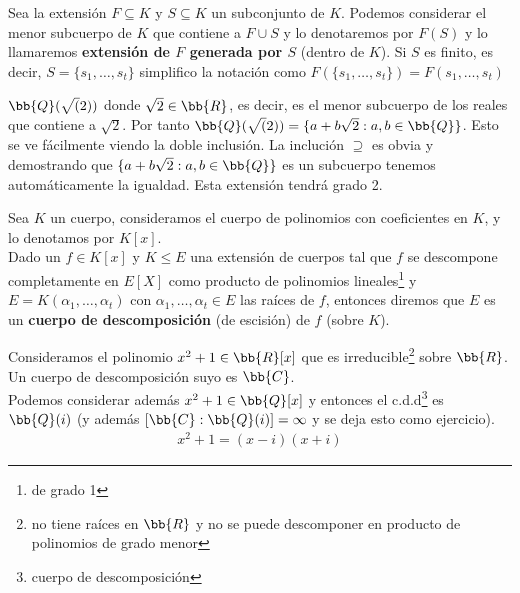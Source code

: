 \begin{notacion}
    Sea la extensión $F\subseteq K$ y $S\subseteq K$ un subconjunto de $K$. Podemos considerar el menor subcuerpo de $K$ que contiene a $F\cup S$ y lo denotaremos por $F(S)$ y lo llamaremos \textbf{extensión de $F$ generada por $S$} (dentro de $K$). Si $S$ es finito, es decir, $S=\{s_1,\dots,s_t\}$ simplifico la notación como $F(\{s_1,\dots,s_t\}) = F(s_1,\dots,s_t)$
\end{notacion}

\begin{ejemplo}
    $\bb{Q}(\sqrt(2))$ donde $\sqrt{2}\in \bb{R}$, es decir, es el menor subcuerpo de los reales que contiene a $\sqrt{2}$. Por tanto $\bb{Q}(\sqrt(2)) = \{a+b\sqrt{2} : a,b\in \bb{Q}\}$. Esto se ve fácilmente viendo la doble inclusión. La inclución $\supseteq$ es obvia y demostrando que $\{a+b\sqrt{2} : a,b\in \bb{Q}\}$ es un subcuerpo tenemos automáticamente la igualdad. Esta extensión tendrá grado 2.
\end{ejemplo}

\begin{definicion}
    Sea $K$ un cuerpo, consideramos el cuerpo de polinomios con coeficientes en $K$, y lo denotamos por $K[x]$. \\
    
    Dado un $f\in K[x]$ y $K\leq E$ una extensión de cuerpos tal que $f$ se descompone completamente en $E[X]$ como producto de polinomios lineales\footnote{de grado 1} y $E=K(\alpha_1,\dots,\alpha_t)$ con $\alpha_1, \dots, \alpha_t\in E$ las raíces de $f$, entonces diremos que $E$ es un \textbf{cuerpo de descomposición} (de escisión) de $f$ (sobre $K$).
\end{definicion}

\begin{ejemplo}
    Consideramos el polinomio $x^2 + 1 \in \bb{R}[x]$ que es irreducible\footnote{no tiene raíces en $\bb{R}$ y no se puede descomponer en producto de polinomios de grado menor} sobre $\bb{R}$. Un cuerpo de descomposición suyo es $\bb{C}$.\\

    Podemos considerar además $x^2+1 \in \bb{Q}[x]$ y entonces el c.d.d\footnote{cuerpo de descomposición} es $\bb{Q}(i)$ (y además $[\bb{C} : \bb{Q}(i)]=\infty$ y se deja esto como ejercicio).
    \begin{gather*}
        x^2 +1 = (x-i)(x+i)
    \end{gather*}
\end{ejemplo}

